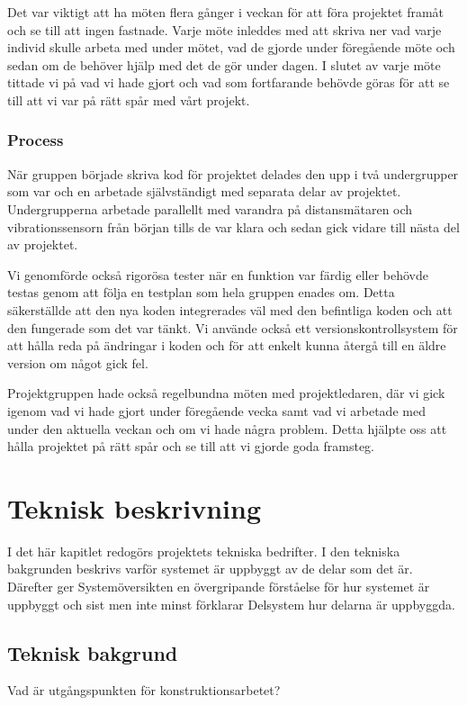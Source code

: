 \documentclass{article}
\begin{document}
Det var viktigt att ha möten flera gånger i veckan för att föra projektet framåt och se till att ingen fastnade.
Varje möte inleddes med att skriva ner vad varje individ skulle arbeta med under mötet, vad de gjorde under föregående möte och sedan om de behöver hjälp med det de gör under dagen.
I slutet av varje möte tittade vi på vad vi hade gjort och vad som fortfarande behövde göras för att se till att vi var på rätt spår med vårt projekt.

\subsubsection{Process}
När gruppen började skriva kod för projektet delades den upp i två undergrupper som var och en arbetade självständigt med separata delar av projektet. 
Undergrupperna arbetade parallellt med varandra på distansmätaren och vibrationssensorn från början tills de var klara och sedan gick vidare till nästa del av projektet.

Vi genomförde också rigorösa tester när en funktion var färdig eller behövde testas genom att följa en testplan som hela gruppen enades om. 
Detta säkerställde att den nya koden integrerades väl med den befintliga koden och att den fungerade som det var tänkt.
Vi använde också ett versionskontrollsystem för att hålla reda på ändringar i koden och för att enkelt kunna återgå till en äldre version om något gick fel.

Projektgruppen hade också regelbundna möten med projektledaren,
där vi gick igenom vad vi hade gjort under föregående vecka samt vad vi arbetade med under den aktuella veckan och om vi hade några problem.
Detta hjälpte oss att hålla projektet på rätt spår och se till att vi gjorde goda framsteg.

\newpage
\section{Teknisk beskrivning}
I det här kapitlet redogörs projektets tekniska bedrifter. 
I den tekniska bakgrunden beskrivs varför systemet är uppbyggt av de delar som det är.
Därefter ger Systemöversikten en övergripande förståelse för hur systemet är uppbyggt och sist men inte minst förklarar Delsystem hur delarna är uppbyggda.


\subsection{Teknisk bakgrund}
Vad är utgångspunkten för konstruktionsarbetet?
\end{document}
